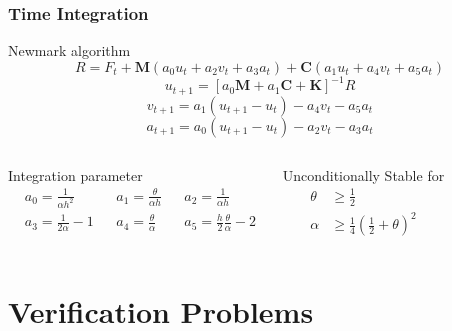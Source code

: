 \documentclass[9pt]{beamer}
\begin{document}
\begin{frame}
\frametitle{Time Integration}
\begin{block}{Newmark algorithm}
\begin{equation*}
R=F_t + \mathbf{M} \left(a_0 u_{t}+a_2 v_{t} + a_3 a_{t} \right) + \mathbf{C} \left(a_1 u_{t}+a_4 v_{t} + a_5 a_{t} \right) 
\end{equation*}
\begin{equation*}
u_{t+1}=\left[a_0 \mathbf{M} + a_1 \mathbf{C} + \mathbf{K} \right] ^ {-1} R
\end{equation*}
\begin{equation*}
v_{t+1}=a_1 \left( u_{t+1} - u_{t} \right) - a_4 v_t -a_5 a_t
\end{equation*}
\begin{equation*}
a_{t+1}=a_0 \left( u_{t+1} - u_{t}\right) - a_2 v_t -a_3 a_t
\end{equation*}
\end{block}
\begin{columns}
\begin{block}{Integration parameter}
\begin{align*}
&a_0 = \frac{1}{\alpha h^2}& 
&a_1 = \frac{\theta}{\alpha h} & 
&a_2 = \frac{1}{\alpha h} \\
&a_3 = \frac{1}{2 \alpha }-1 &  
&a_4 = \frac{\theta}{\alpha} & 
& a_5 = \frac{h}{2} \frac{\theta}{\alpha}-2
\end{align*}

\end{block}
Unconditionally Stable for
\begin{align*}
\theta & \geq \frac{1}{2}  \\
\alpha & \geq \frac{1}{4}\left(\frac{1}{2}+\theta \right)^2
\end{align*}

\end{columns}
\end{frame}

\section{Verification Problems}
\end{document}
